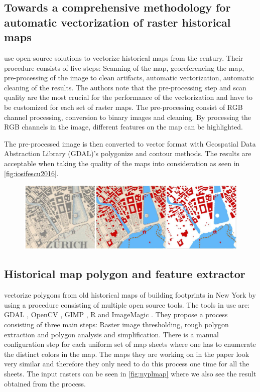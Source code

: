 \subsection{Towards a comprehensive methodology for automatic vectorization of raster historical maps}
\citet{Iosifescu2016} use open-source solutions to vectorize historical maps from the  century. Their procedure consists of five steps: Scanning of the map, georeferencing the map, pre-processing of the image to clean artifacts, automatic vectorization, automatic cleaning of the results. The authors note that the pre-processing step and scan quality are the most crucial for the performance of the vectorization and have to be customized for each set of raster maps. The pre-processing consist of RGB channel processing, conversion to binary images and cleaning. By processing the RGB channels in the image, different features on the map can be highlighted.

The pre-processed image is then converted to vector format with Geospatial Data Abstraction Library \cite{OSGeoa} (GDAL)'s polygonize and contour methods. The results are acceptable when taking the quality of the maps into consideration as seen in \autoref{fig:iosifescu2016}. 

\begin{figure}[H]
    \centering
    \includegraphics[width=0.9\linewidth]{fig/iosifescu2016.png}
    \label{fig:iosifescu2016}
\end{figure}

\subsection{Historical map polygon and feature extractor}

\citet{GiraldoArteaga2013} vectorize polygons from old historical maps of building footprints in New York by using a procedure consisting of multiple open source tools. The tools in use are: GDAL \cite{OSGeoa}, OpenCV \cite{OpenVCTeam2017}, GIMP \cite{GIMP2017}, R \cite{TheRFoundation2017} and ImageMagic \cite{ImageMagickStudioLLC2017}. They propose a process consisting of three main steps: Raster image thresholding, rough polygon extraction and polygon analysis and simplification. There is a manual configuration step for each uniform set of map sheets where one has to enumerate the distinct colors in the map. The maps they are working on in the paper look very similar and therefore they only need to do this process one time for all the sheets. The input rasters can be seen in \autoref{fig:nyplmap} where we also see the result obtained from the process.

